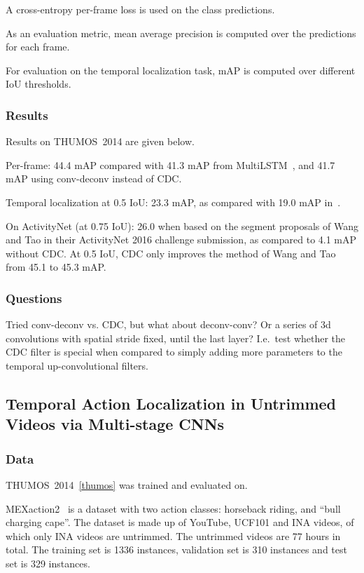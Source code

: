 \documentclass[a4paper, 12pt]{article}
\begin{document}
A cross-entropy per-frame loss is used on the class predictions.

As an evaluation metric, mean average precision is computed over the
predictions for each frame.

For evaluation on the temporal localization task, mAP is computed over
different IoU thresholds.

\subsubsection{Results}

Results on THUMOS~2014 are given below.

Per-frame: 44.4 mAP compared with 41.3 mAP from
MultiLSTM~\citet{DBLP:journals/corr/YeungRJAML15}, and 41.7 mAP using
conv-deconv instead of CDC\@.

Temporal localization at 0.5 IoU\@: 23.3 mAP, as compared with 19.0 mAP
in~\citet{DBLP:journals/corr/ShouWC16}.

On ActivityNet (at 0.75 IoU): 26.0 when based on the segment proposals
of Wang and Tao in their ActivityNet 2016 challenge submission, as compared to
4.1 mAP without CDC\@. At 0.5 IoU, CDC only improves the method of Wang and Tao
from 45.1 to 45.3 mAP\@.

\subsubsection{Questions}

Tried conv-deconv vs. CDC, but what about deconv-conv? Or a series of 3d
convolutions with spatial stride fixed, until the last layer? I.e.\ test
whether the CDC filter is special when compared to simply adding more
parameters to the temporal up-convolutional filters.


\subsection{Temporal Action Localization in Untrimmed Videos via Multi-stage
            CNNs~\citet{DBLP:journals/corr/ShouWC16}}

\subsubsection{Data}

THUMOS~2014~\ref{thumos} was trained and evaluated on.

MEXaction2~\citet{MEXaction2} is a dataset with two action classes: horseback
riding, and ``bull charging cape''. The dataset is made up of YouTube, UCF101
and INA videos, of which only INA videos are untrimmed. The untrimmed videos
are 77 hours in total. The training set is 1336 instances, validation set is
310 instances and test set is 329 instances.
\end{document}
